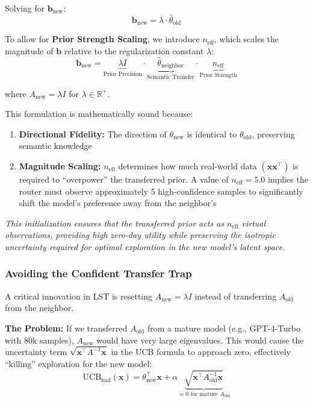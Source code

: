 \documentclass[sigconf,nonacm]{acmart}
\begin{document}
Solving for $\mathbf{b}_{\text{new}}$:
\begin{equation}
\mathbf{b}_{\text{new}} = \lambda \cdot \hat{\theta}_{\text{old}}
\end{equation}

To allow for \textbf{Prior Strength Scaling}, we introduce $n_{\text{eff}}$, which scales the magnitude of $\mathbf{b}$ relative to the regularization constant $\lambda$:
\begin{equation}
\mathbf{b}_{\text{new}} = \underbrace{\lambda I}_{\text{Prior Precision}} \cdot \underbrace{\hat{\theta}_{\text{neighbor}}}_{\text{Semantic Transfer}} \cdot \underbrace{n_{\text{eff}}}_{\text{Prior Strength}}
\end{equation}

where $A_{\text{new}} = \lambda I$ for $\lambda \in \mathbb{R}^+$.

This formulation is mathematically sound because:
\begin{enumerate}
    \item \textbf{Directional Fidelity:} The direction of $\theta_{\text{new}}$ is identical to $\theta_{\text{old}}$, preserving semantic knowledge
    \item \textbf{Magnitude Scaling:} $n_{\text{eff}}$ determines how much real-world data $(\mathbf{x}\mathbf{x}^\top)$ is required to ``overpower'' the transferred prior. A value of $n_{\text{eff}} = 5.0$ implies the router must observe approximately 5 high-confidence samples to significantly shift the model's preference away from the neighbor's
\end{enumerate}

\textit{This initialization ensures that the transferred prior acts as $n_{\text{eff}}$ virtual observations, providing high zero-day utility while preserving the isotropic uncertainty required for optimal exploration in the new model's latent space.}

\subsubsection{Avoiding the Confident Transfer Trap}

A critical innovation in LST is resetting $A_{\text{new}} = \lambda I$ instead of transferring $A_{\text{old}}$ from the neighbor.

\textbf{The Problem:} If we transferred $A_{\text{old}}$ from a mature model (e.g., GPT-4-Turbo with 80k samples), $A_{\text{new}}$ would have very large eigenvalues. This would cause the uncertainty term $\sqrt{\mathbf{x}^\top A^{-1} \mathbf{x}}$ in the UCB formula to approach zero, effectively ``killing'' exploration for the new model:
\begin{equation}
\text{UCB}_{\text{bad}}(\mathbf{x}) = \theta_{\text{new}}^\top \mathbf{x} + \alpha \underbrace{\sqrt{\mathbf{x}^\top A_{\text{old}}^{-1} \mathbf{x}}}_{\approx 0 \text{ for mature } A_{\text{old}}}
\end{equation}
\end{document}
